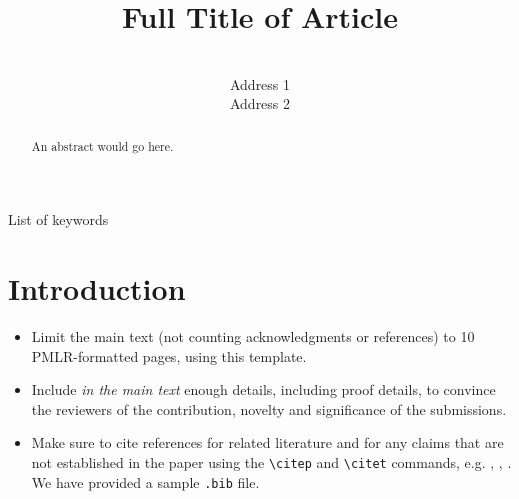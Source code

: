 \documentclass[final]{l4dc2026}
\title[Short Title]{Full Title of Article}
\author{%
 \Name{Author Name1} \Email{abc@sample.com}\\
 \addr Address 1
 \AND
 \Name{Author Name2} \Email{xyz@sample.com}\\
 \addr Address 2%
}
\begin{document}
\maketitle

\begin{abstract}%
 An abstract would go here.%
\end{abstract}

\begin{keywords}%
  List of keywords%
\end{keywords}

\section{Introduction}

\begin{itemize}
  \item Limit the main text (not counting acknowledgments or references) to 10 PMLR-formatted pages, using this template.
  \item Include {\em in the main text} enough details, including proof details, to convince the reviewers of the contribution, novelty and significance of the submissions.
  \item Make sure to cite references for related literature and for any claims that are not established in the paper using the \texttt{\textbackslash citep} and \texttt{\textbackslash citet} commands, e.g. \citep{levine2016end}, \citet{doyle2003guaranteed}, \citet[Theorem 2.2.1]{vershynin2018high}. We have provided a sample \texttt{.bib} file.
\end{itemize}



\end{document}
